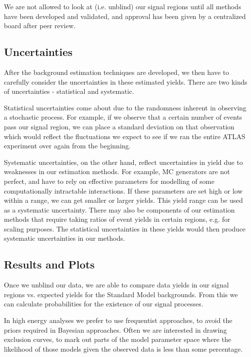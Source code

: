 We are not allowed to look at (i.e. unblind) our signal regions until all methods have been developed and validated, and approval has been given by a centralized board after peer review.

\subsection*{Uncertainties}

After the background estimation techniques are developed, we then have to carefully consider the uncertainties in these estimated yields. There are two kinds of uncertainties - statistical and systematic.

Statistical uncertainties come about due to the randomness inherent in observing a stochastic process. For example, if we observe that a certain number of events pass our signal region, we can place a standard deviation on that observation which would reflect the fluctuations we expect to see if we ran the entire ATLAS experiment over again from the beginning.

Systematic uncertainties, on the other hand, reflect uncertainties in yield due to weaknesses in our estimation methods. For example, MC generators are not perfect, and have to rely on effective parameters for modelling of some computationally intractable interactions. If these parameters are set high or low within a range, we can get smaller or larger yields. This yield range can be used as a systematic uncertainty. There may also be components of our estimation methods that require taking ratios of event yields in certain regions, e.g. for scaling purposes. The statistical uncertainties in these yields would then produce systematic uncertainties in our methods.

\subsection*{Results and Plots}

Once we unblind our data, we are able to compare data yields in our signal regions vs. expected yields for the Standard Model backgrounds. From this we can calculate probabilities for the existence of our signal processes.

In high energy analyses we prefer to use frequentist approaches, to avoid the priors required in Bayesian approaches. Often we are interested in drawing exclusion curves, to mark out parts of the model parameter space where the likelihood of those models given the observed data is less than some percentage.

